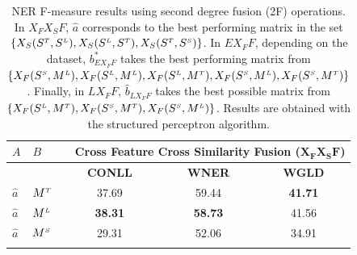 \begin{table}[t!]
\centering

\caption{NER F-measure results using second degree fusion (2F) operations. In $X_FX_SF$, $\hat{a}$ corresponds to the best performing matrix in the set $\{ X_S(S^{\scriptscriptstyle T}, S^{\scriptscriptstyle L}),X_S(S^{\scriptscriptstyle L}, S^{\scriptscriptstyle T}), \allowbreak X_S(S^{\scriptscriptstyle T}, S^{\scriptscriptstyle S})\}$. In $EX_FF$, depending on the dataset, $b^*_{\scriptscriptstyle EX_FF}$  takes the best performing matrix from $\{X_F(S^{\scriptscriptstyle S}, M^{\scriptscriptstyle L}), \allowbreak X_F(S^{\scriptscriptstyle L}, M^{\scriptscriptstyle L}), X_F(S^{\scriptscriptstyle L}, M^{\scriptscriptstyle T}), \allowbreak X_F(S^{\scriptscriptstyle S}, M^{\scriptscriptstyle L}), X_F(S^{\scriptscriptstyle S}, M^{\scriptscriptstyle T}) \}$. Finally, in $LX_FF$, $\hat{b}_{\scriptscriptstyle LX_FF}$ takes the best possible matrix from $\{X_F(S^{\scriptscriptstyle L}, M^{\scriptscriptstyle T}), X_F(S^{\scriptscriptstyle S}, M^{\scriptscriptstyle T}), \allowbreak X_F(S^{\scriptscriptstyle S}, M^{\scriptscriptstyle L}) \}$. Results are obtained with the structured perceptron algorithm.}
\label{tab:ner_2d}
\begin{tabular}{@{}llccc@{}}
	\toprule
	$A$                      & $B$            & \multicolumn{3}{r}{\textbf{Cross Feature Cross Similarity Fusion ($\mathbf{X_FX_SF}$)}}  \\ \midrule
	                         &                & \textbf{CONLL} & \textbf{WNER}  &             \textbf{WGLD}             \\
	\cmidrule{3-5}
$\hat{a}$ & $M^{\scriptscriptstyle T}$      & 37.69 & 59.44 &            \textbf{41.71}             \\
	$\hat{a}$                & $M^{\scriptscriptstyle L}$      & \textbf{38.31} & \textbf{58.73} &            41.56             \\
	$\hat{a}$                & $M^{\scriptscriptstyle S}$      & 29.31 & 52.06 &            34.91             \\ \midrule
	                         &                &
	                         

\end{tabular}
\end{table}
